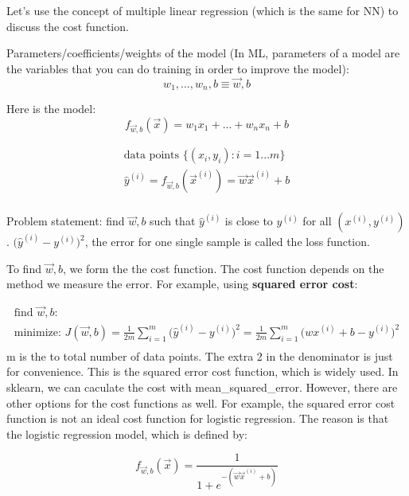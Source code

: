 \documentclass[12pt]{report}
\begin{document}
Let's use the concept of multiple linear regression (which is the same for NN) to discuss the cost function.

Parameters/coefficients/weights of the model (In ML, parameters of a model are the variables that you can do training in order to improve the model):
\begin{equation}
  w_1, . . . , w_n , b \equiv \overrightarrow{w} ,b
\end{equation}

Here is the model:
\begin{equation}
	f_{\overrightarrow{w},b} (\overrightarrow{x}) = w_1x_1 +  ... + w_nx_n + b
\end{equation}

\begin{multline}
		\text{data points } \{(x_i, y_i): i=1 ... m \} \\
    \hat{y}^{(i)} = f_{\overrightarrow{w},b} (\overrightarrow{x}^{(i)})  = \overrightarrow{w} \overrightarrow{x} ^ {(i)} + b \\
\end{multline}

Problem statement: find $\overrightarrow{w},b$ such that $\hat{y}^{(i)}$ is close to $y^{(i)}$ for all $(x^{(i)}, y^{(i)} )$. $\big(\hat{y}^{(i)}  - y^{(i)} \big) ^2$, the error for one single sample is called the loss function.

To find $\overrightarrow{w},b$, we form the the cost function. The cost function depends on the method we measure the error. For example, using \textbf{squared error cost}:

\begin{multline}
	\text{find $\overrightarrow{w},b$:} \\
	\text{minimize:  }  J(\overrightarrow{w},b) = \frac{1}{2m} \sum_{i=1}^{m} \big(\hat{y}^{(i)}  - y^{(i)} \big) ^2 = \frac{1}{2m} \sum_{i=1}^{m} \big( wx ^ {(i)} + b - y^{(i)} \big) ^2 \\
\end{multline}
m is the to total number of data points. The extra 2 in the denominator is just for convenience. This is the squared error cost function, which is widely used. In sklearn, we can caculate the cost with mean\_squared\_error. However, there are other options for the cost functions as well. For example, the squared error cost function is not an ideal cost function for logistic regression. The reason is that the logistic regression model, which is defined by:

\begin{equation}
  f_{\overrightarrow{w},b} (\overrightarrow{x}) = \frac{1}{1+e^{-(\overrightarrow{w} \overrightarrow{x} ^ {(i)} + b)}}
\end{equation}
\end{document}
